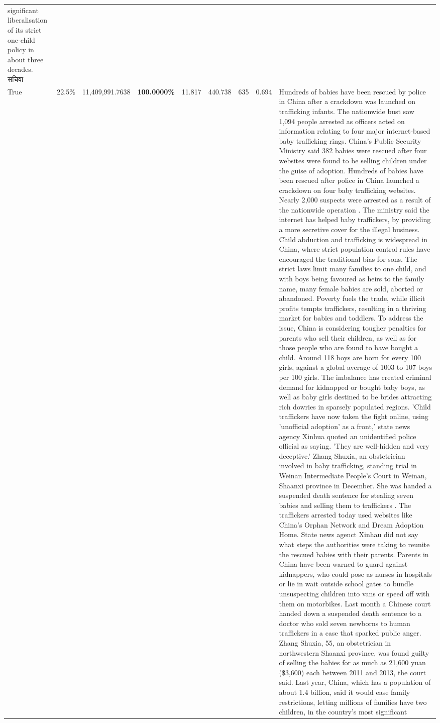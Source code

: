 \begin{table}[H]
\begin{tabular}{lllrlllll}
significant liberalisation of its strict one-child policy in about three decades. सचिवा \\
\cline{1-9}
True & 22.5\% & 11,409,991.7638 & \bfseries \color{red} 100.0000\% & 11.817 & 440.738 & 635 & 0.694 & Hundreds of babies have been rescued by police in China after a crackdown was launched on trafficking infants. The nationwide bust saw 1,094 people arrested as officers acted on information relating to four major internet-based baby trafficking rings. China's Public Security Ministry said 382 babies were rescued after four websites were found to be selling children under the guise of adoption. Hundreds of babies have been rescued after police in China launched a crackdown on four baby trafficking websites. Nearly 2,000 suspects were arrested as a result of the nationwide operation . The ministry said the internet has helped baby traffickers, by providing a more secretive cover for the illegal business. Child abduction and trafficking is widespread in China, where strict population control rules have encouraged the traditional bias for sons. The strict laws limit many families to one child, and with boys being favoured as heirs to the family name, many female babies are sold, aborted or abandoned. Poverty fuels the trade, while illicit profits tempts traffickers, resulting in a thriving market for babies and toddlers. To address the issue, China is considering tougher penalties for parents who sell their children, as well as for those people who are found to have bought a child. Around 118 boys are born for every 100 girls, against a global average of 1003 to 107 boys per 100 girls. The imbalance has created criminal demand for kidnapped or bought baby boys, as well as baby girls destined to be brides attracting rich dowries in sparsely populated regions. 'Child traffickers have now taken the fight online, using 'unofficial adoption' as a front,' state news agency Xinhua quoted an unidentified police official as saying. 'They are well-hidden and very deceptive.' Zhang Shuxia, an obstetrician involved in baby trafficking, standing trial in Weinan Intermediate People's Court in Weinan, Shaanxi province in December. She was handed a suspended death sentence for stealing seven babies and selling them to traffickers . The traffickers arrested today used websites like China's Orphan Network and Dream Adoption Home. State news agenct Xinhau did not say what steps the authorities were taking to reunite the rescued babies with their parents. Parents in China have been warned to guard against kidnappers, who could pose as nurses in hospitals or lie in wait outside school gates to bundle unsuspecting children into vans or speed off with them on motorbikes. Last month a Chinese court handed down a suspended death sentence to a doctor who sold seven newborns to human traffickers in a case that sparked public anger. Zhang Shuxia, 55, an obstetrician in northwestern Shaanxi province, was found guilty of selling the babies for as much as 21,600 yuan (\$3,600) each between 2011 and 2013, the court said. Last year, China, which has a population of about 1.4 billion, said it would ease family restrictions, letting millions of families have two children, in the country's most significant 
\end{tabular}
\end{table}
